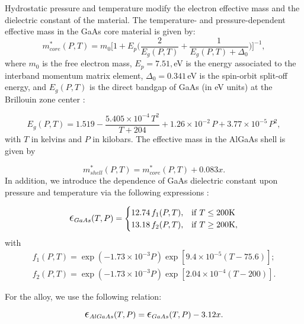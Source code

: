 \documentclass[nanomaterials,article,submit,moreauthors,pdftex]{Definitions/mdpi}
\begin{document}
Hydrostatic pressure and temperature modify the electron effective mass and the dielectric constant of the material. The temperature- and pressure-dependent effective mass in the GaAs core material is given by:
\begin{equation}
    m^{*}_{core}(P,T) = m_{0}\biggl[ 1+E_{p}\biggl( \frac{2}{E_{g}(P,T)}+\frac{1}{E_{g}(P,T)+ \Delta_{0} }\biggr)\biggr]^{-1},
\end{equation}
where $m_0$ is the free electron mass, $E_{p}=7.51,$eV is the energy associated to the interband  momentum matrix element, $\Delta_0=0.341\,$eV is the spin-orbit split-off energy, and $E_g(P,T)$ is the direct bandgap of GaAs (in eV units) at the Brillouin zone center \cite{Paul1991,Baser2013,Baser2016}:

\begin{equation}
    E_g(P,T)=1.519-\frac{5.405\times 10^{-4}\,T^2}{T+204}+1.26\times 10^{-2}\,P+3.77\times 10^{-5}\,P^2,
\end{equation}
with $T$ in kelvins and $P$ in kilobars. The effective mass in the AlGaAs shell is given by

\begin{equation}
   m^{*}_{shell}(P,T) = m^{*}_{core}(P,T)+0.083x.
\end{equation}
In addition, we introduce the dependence of GaAs dielectric constant upon pressure and temperature via the following expressions \cite{Sivakami2013}:

\begin{equation}
    \mbox{\Large $\epsilon$}_{GaAs} (T,P) = \begin{cases}
        12.74\,f_1(P,T), & {\rm if}\;T \leq 200 {\rm K} \\
        13.18\, f_2(P,T), & {\rm if}\;T \geq 200 {\rm K}, \\
        \end{cases}
\end{equation}
with
\begin{align}
f_1(P,T)=\exp \left( -1.73\times 10^{-3}P\right)\exp\left [ 9.4\times 10^{-5} (T-75.6)\right ];\nonumber \\
f_2(P,T)=\exp\left( -1.73\times 10^{-3}P\right)\exp\left [ 2.04\times 10^{-4} (T-200)\right ].
\end{align}

For the alloy, we use the following relation:

\begin{equation}
    \mbox{\Large $\epsilon$}_{AlGaAs} (T,P)=\mbox{\Large $\epsilon$}_{GaAs} (T,P)-3.12 x.
\end{equation}
\end{document}
